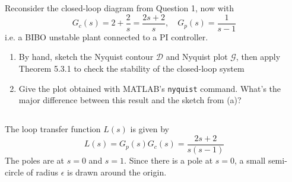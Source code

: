 \FloatBarrier
\section{}

Reconsider the closed-loop diagram from Question 1, now with
\begin{equation*}
    G_c(s) = 2 + \frac{2}{s}=\frac{2s + 2}{s}, \quad G_p(s) = \frac{1}{s-1}
\end{equation*}
i.e. a BIBO unstable plant connected to a PI controller.
\begin{enumerate}[label=(\alph*)]
    \item By hand, sketch the Nyquist contour $\mathcal{D}$ and Nyquist plot $\mathcal{G}$, then apply Theorem 5.3.1 to
    check the stability of the closed-loop system
    \item Give the plot obtained with MATLAB's \texttt{nyquist} command. What's the major difference
    between this result and the sketch from (a)?
\end{enumerate}

\subsection{}
The loop transfer function $L(s)$ is given by
\begin{equation*}
    L(s) = G_p(s)G_c(s) = \frac{2s + 2}{s(s-1)}
\end{equation*}
The poles are at $s=0$ and $s=1$. Since there is a pole at $s=0$, a small semi-circle of radius $\epsilon$ is drawn
around the origin. 

